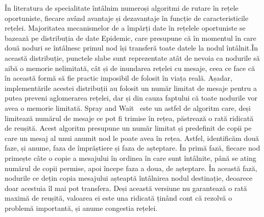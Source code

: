 \documentclass[12pt,a4paper]{report}
\begin{document}
În literatura de specialitate întâlnim numeroși algoritmi de rutare în rețele oportuniste, fiecare având avantaje și dezavantaje în funcție de caracteristicile rețelei. Majoritatea mecanismelor de a împărți date în rețelele oportuniste se bazează pe distribuția de date Epidemic, care presupune că în momentul în care două noduri se întâlnesc primul nod își transferă toate datele la nodul întâlnit.În această distribuție, punctele slabe sunt reprezentate atât de nevoia ca nodurile să aibă o memorie nelimitată, cât și de inundarea rețelei cu mesaje, ceea ce face că în această formă să fie practic imposibil de folosit în viața reală. Așadar, implementările acestei distribuții au folosit un număr limitat de mesaje pentru a putea preveni aglomerarea rețelei, dar și din cauza faptului că toate nodurile vor avea o memorie limitată. Spray and Wait~\cite{SprayAndWait} este un astfel de algoritm care, deși limitează numărul de mesaje ce pot fi trimise în rețea, păstrează o rată ridicată de reușită. Acest algoritm presupune un număr limitat și predefinit de copii pe care un mesaj al unui anumit nod le poate avea în rețea. Astfel, identificăm două faze, și anume, faza de împrăștiere și faza de așteptare. În primă fază, fiecare nod primește câte o copie a mesajului în ordinea în care sunt întâlnite, până se ating numărul de copii permise, apoi începe faza a doua, de așteptare. În această fază, nodurile ce dețin copia mesajului așteaptă întâlnirea nodul destinație, deoarece doar acestuia îl mai pot transfera. Deși această versiune nu garantează o rată maximă de reușită, valoarea ei este una ridicată ținând cont că rezolvă o problemă importantă, și anume congestia rețelei. 
\end{document}

